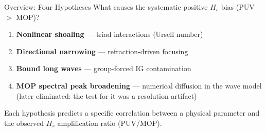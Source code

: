 \documentclass[10pt, aspectratio=169]{beamer}
\begin{document}
\begin{frame}{Overview: Four Hypotheses}
  What causes the systematic positive $H_s$ bias (PUV $>$ MOP)?
  \vspace{0.5em}
  \begin{enumerate}
    \item \textbf{Nonlinear shoaling} --- triad interactions
          (Ursell number)
    \item \textbf{Directional narrowing} --- refraction-driven
          focusing
    \item \textbf{Bound long waves} --- group-forced IG
          contamination
    \item \textbf{MOP spectral peak broadening} --- numerical
          diffusion in the wave model
          \textcolor{red!75!black}{(later eliminated: the test for it
          was a resolution artifact)}
  \end{enumerate}
  \vspace{0.5em}
  Each hypothesis predicts a specific correlation between
  a physical parameter and the observed $H_s$ amplification
  ratio (PUV/MOP).
\end{frame}

\end{document}
